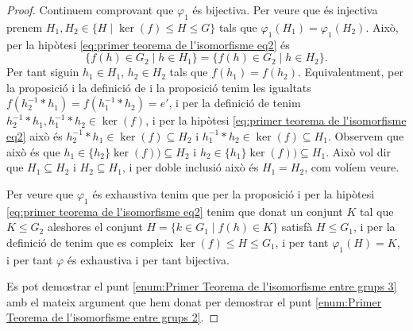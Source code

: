 \documentclass[../Apunts.tex]{subfiles}
\begin{document}
\begin{theorem}
\begin{proof}
			Continuem comprovant que \(\varphi_{1}\) és bijectiva. Per veure que és injectiva prenem \(H_{1},H_{2}\in\{H\mid\ker(f)\leq H\leq G\}\) tals que \(\varphi_{1}(H_{1})=\varphi_{1}(H_{2})\). Això, per la hipòtesi \eqref{eq:primer teorema de l'isomorfisme eq2} és
			\[\{f(h)\in G_{2}\mid h\in H_{1}\}=\{f(h)\in G_{2}\mid h\in H_{2}\}.\]
			Per tant siguin \(h_{1}\in H_{1}\), \(h_{2}\in H_{2}\) tals que \(f(h_{1})=f(h_{2})\). Equivalentment, per la proposició  i la definició de  i la proposició  tenim les igualtats \(f(h_{2}^{-1}\ast h_{1})=f(h_{1}^{-1}\ast h_{2})=e'\), i per la definició de  tenim \(h_{2}^{-1}\ast h_{1},h_{1}^{-1}\ast h_{2}\in\ker(f)\), i per la hipòtesi \eqref{eq:primer teorema de l'isomorfisme eq2} això és \(h_{2}^{-1}\ast h_{1}\in\ker(f)\subseteq H_{2}\) i \(h_{1}^{-1}\ast h_{2}\in\ker(f)\subseteq H_{1}\). Observem que això és que \(h_{1}\in\{h_{2}\}\ker(f))\subseteq H_{2}\) i \(h_{2}\in\{h_{1}\}\ker(f))\subseteq H_{1}\). Això vol dir que \(H_{1}\subseteq H_{2}\) i \(H_{2}\subseteq H_{1}\), i per doble inclusió això és \(H_{1}=H_{2}\), com volíem veure. %
			
			Per veure que \(\varphi_{1}\) és exhaustiva tenim que per la proposició  i per la hipòtesi \eqref{eq:primer teorema de l'isomorfisme eq2} tenim que donat un conjunt \(K\) tal que \(K\leq G_{2}\) aleshores el conjunt \(H=\{k\in G_{1}\mid f(h)\in K\}\) satisfà \(H\leq G_{1}\), i per la definició de  tenim que es compleix \(\ker(f)\leq H\leq G_{1}\), i per tant \(\varphi_{1}(H)=K\), i per tant \(\varphi\) és exhaustiva i per tant bijectiva. %
			
			Es pot demostrar el punt \eqref{enum:Primer Teorema de l'isomorfisme entre grups 3} amb el mateix argument que hem donat per demostrar el punt \eqref{enum:Primer Teorema de l'isomorfisme entre grups 2}.
		\end{proof}
	\end{theorem}
\end{document}
